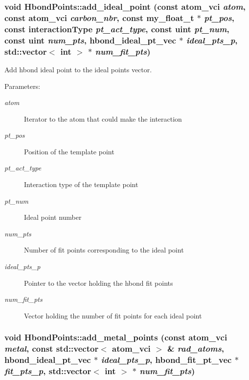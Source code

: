 \subsubsection{\setlength{\rightskip}{0pt plus 5cm}void Hbond\-Points::add\_\-ideal\_\-point (const atom\_\-vci {\em atom}, const atom\_\-vci {\em carbon\_\-nbr}, const my\_\-float\_\-t $\ast$ {\em pt\_\-pos}, const interaction\-Type {\em pt\_\-act\_\-type}, const uint {\em pt\_\-num}, const uint {\em num\_\-pts}, \bf{hbond\_\-ideal\_\-pt\_\-vec} $\ast$ {\em ideal\_\-pts\_\-p}, std::vector$<$ int $>$ $\ast$ {\em num\_\-fit\_\-pts})\hspace{0.3cm}{\tt  [private]}}\label{classSimSite3D_1_1HbondPoints_7a16d0105816da029d43b16136fa67f8}


Add hbond ideal point to the ideal points vector. 

\begin{Desc}
\item[Parameters:]
\begin{description}
\item[{\em atom}]Iterator to the atom that could make the interaction \item[{\em pt\_\-pos}]Position of the template point \item[{\em pt\_\-act\_\-type}]Interaction type of the template point \item[{\em pt\_\-num}]Ideal point number \item[{\em num\_\-pts}]Number of fit points corresponding to the ideal point \item[{\em ideal\_\-pts\_\-p}]Pointer to the vector holding the hbond fit points \item[{\em num\_\-fit\_\-pts}]Vector holding the number of fit points for each ideal point \end{description}
\end{Desc}
\subsubsection{\setlength{\rightskip}{0pt plus 5cm}void Hbond\-Points::add\_\-metal\_\-points (const atom\_\-vci {\em metal}, const std::vector$<$ atom\_\-vci $>$ \& {\em rad\_\-atoms}, \bf{hbond\_\-ideal\_\-pt\_\-vec} $\ast$ {\em ideal\_\-pts\_\-p}, \bf{hbond\_\-fit\_\-pt\_\-vec} $\ast$ {\em fit\_\-pts\_\-p}, std::vector$<$ int $>$ $\ast$ {\em num\_\-fit\_\-pts})\hspace{0.3cm}{\tt  [private]}}\label{classSimSite3D_1_1HbondPoints_a51c90df30b66be9745fe00ea616d5be}



